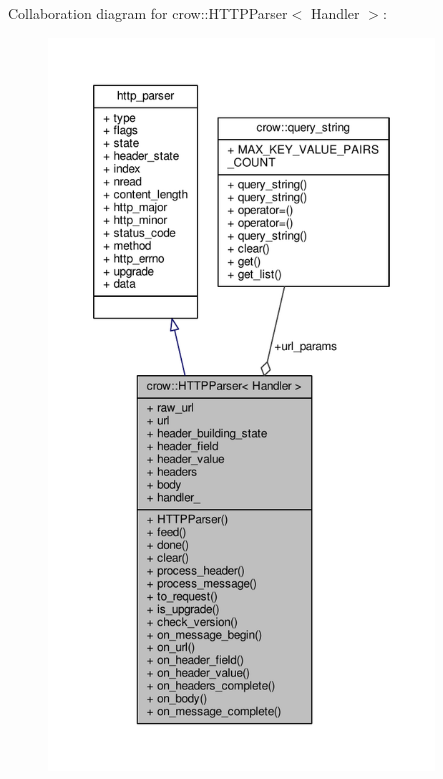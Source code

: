 Collaboration diagram for crow\-:\-:H\-T\-T\-P\-Parser$<$ Handler $>$\-:
\nopagebreak
\begin{figure}[H]
\begin{center}
\leavevmode
\includegraphics[height=550pt]{structcrow_1_1_h_t_t_p_parser__coll__graph}
\end{center}
\end{figure}
